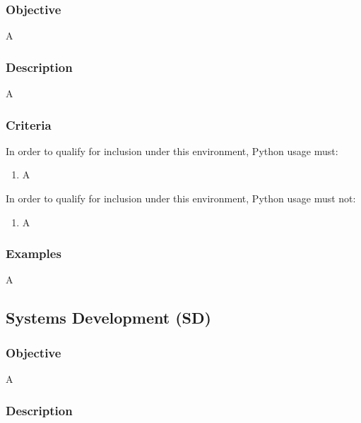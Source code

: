 		\subsubsection{Objective}

			A

		\subsubsection{Description}

			A

		\subsubsection{Criteria}

			In order to qualify for inclusion under this environment, Python usage must:

			\begin{enumerate}
        		\item A
        	\end{enumerate}

			In order to qualify for inclusion under this environment, Python usage must not:

			\begin{enumerate}
        		\item A
        	\end{enumerate}

		\subsubsection{Examples}

			A


	\subsection{Systems Development (SD)}

		\subsubsection{Objective}

			A

		\subsubsection{Description}


